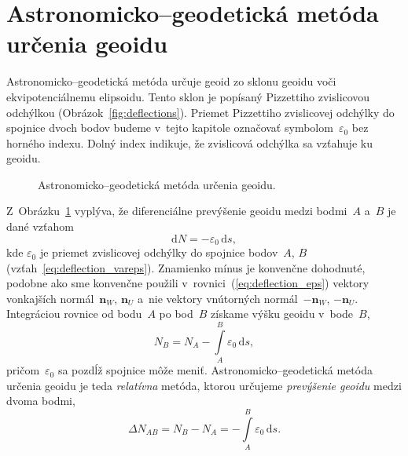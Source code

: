 \documentclass[a4paper, 12pt]{book}
\newcommand{\diff}{\mathrm d}
\let\vec\mathbf
\begin{document}
\section{Astronomicko--geodetická metóda určenia geoidu}
\label{sec:geoid_astrogeodetic}

Astronomicko--geodetická metóda určuje geoid zo sklonu geoidu voči 
ekvipotenciálnemu elipsoidu.  Tento sklon je popísaný Pizzettiho zvislicovou 
odchýlkou (Obrázok~\ref{fig:deflections}).  Priemet Pizzettiho zvislicovej 
odchýlky do spojnice dvoch bodov budeme v~tejto kapitole označovať 
symbolom~$\varepsilon_0$ bez horného indexu.  Dolný index indikuje, že 
zvislicová odchýlka sa vzťahuje ku geoidu.

\begin{figure}[bt]
\centering

\caption{Astronomicko--geodetická metóda určenia geoidu.}
\label{fig:astrogeodetic_method}
\end{figure}

Z~Obrázku~\ref{fig:astrogeodetic_method} vyplýva, že diferenciálne prevýšenie 
geoidu medzi bodmi~$A$ a~$B$ je dané vzťahom \parencite{MoritzPhysicalGeodesy}
%
\begin{equation}
\label{eq:N_deflections}
\diff N = -\varepsilon_0 \, \diff s{,}
\end{equation}
%
kde $\varepsilon_0$ je priemet zvislicovej odchýlky do spojnice bodov~$A$, $B$ 
(vzťah~\ref{eq:deflection_vareps}).  Znamienko mínus je konvenčne dohodnuté, 
podobne ako sme konvenčne použili v~rovnici~(\ref{eq:deflection_eps}) vektory 
vonkajších normál~$\vec n_W$, $\vec n_U$ a~nie vektory vnútorných normál~$-\vec 
n_W$, $-\vec n_U$.  Integráciou rovnice od bodu~$A$ po bod~$B$ získame výšku 
geoidu v~bode~$B$,
%
\begin{equation}
\label{eq:N_deflections_nb}
N_B = N_A - \int\limits_A^B \varepsilon_0 \, \diff s{,}
\end{equation}
%
pričom~$\varepsilon_0$ sa pozdĺž spojnice môže meniť.  Astronomicko--geodetická 
metóda určenia geoidu je teda \emph{relatívna} metóda, ktorou určujeme 
\emph{prevýšenie geoidu} medzi dvoma bodmi,
%
\begin{equation}
\label{eq:N_deflections_delta}
\Delta N_{AB} = N_B - N_A = - \int\limits_A^B \varepsilon_0 \, \diff s{.}
\end{equation}
\end{document}
